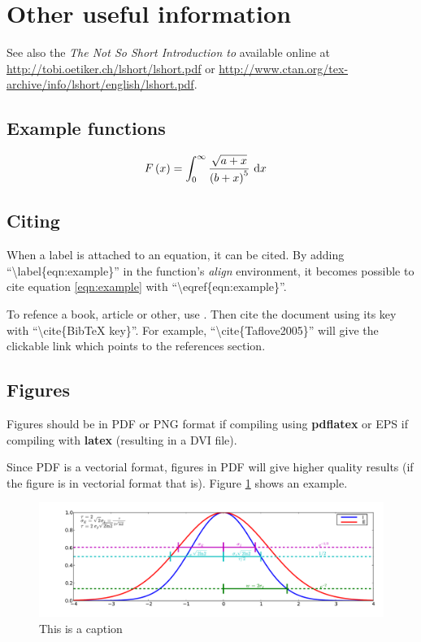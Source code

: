 \newpage
\section{Other useful information}

See also the \textit{The Not So Short Introduction to \LaTeXe}\cite{NotSoShort}
available online at \url{http://tobi.oetiker.ch/lshort/lshort.pdf} or
\url{http://www.ctan.org/tex-archive/info/lshort/english/lshort.pdf}.

\subsection{Example functions}
\begin{align}
F\left( x \right) & = \int_{0}^{\infty} \frac{\sqrt{a + x}}{\left( b + x \right)^5}~\textrm{d}x
\label{eqn:example}
\end{align}

\subsection{Citing}
When a label is attached to an equation, it can be cited. By adding ``\textbackslash label\{eqn:example\}'' in
the function's \textit{align} environment, it becomes possible to cite equation \eqref{eqn:example} with
``\textbackslash eqref\{eqn:example\}''.

To refence a book, article or other, use \BibTeX. Then cite the document
using its \BibTeX key with ``\textbackslash cite\{BibTeX key\}''. For example,
``\textbackslash cite\{Taflove2005\}'' will give the clickable link \cite{Taflove2005}
which points to the references section.



\subsection{Figures}
Figures should be in PDF or PNG format if compiling using \textbf{pdflatex} or EPS if compiling
with \textbf{latex} (resulting in a DVI file).

Since PDF is a vectorial format, figures in PDF will give higher quality results (if the figure
is in vectorial format that is). Figure \ref{fig:example_figure} shows an example.

\begin{figure}
\begin{center}
\includegraphics[width=\textwidth]{forme_I_E.pdf}
\end{center}
\caption{This is a caption}
\label{fig:example_figure}
\end{figure}


